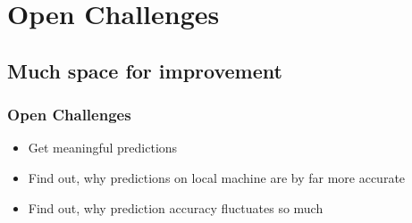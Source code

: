 \documentclass[11pt]{beamer}
\begin{document}
\section{Open Challenges}
\subsection{Much space for improvement}
\begin{frame}
  \frametitle{Open Challenges}
  \begin{itemize}
  	\item Get meaningful predictions
  	\item Find out, why predictions on local machine are by far more accurate
    \item Find out, why prediction accuracy fluctuates so much
  \end{itemize}
\end{frame}
\end{document}
